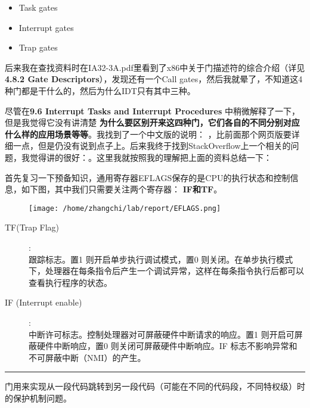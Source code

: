 \documentclass{article}
\newcommand{\highlight}[1]{{\bfseries \color{red}  #1}}
\begin{document}
\begin{CJK*}{UTF8}{gkai}
\begin{itemize}
\item{Task gates}
\item{Interrupt gates}
\item{Trap gates}
\end{itemize}

后来我在查找资料时在IA32-3A.pdf里看到了x86中关于门描述符的综合介绍（详见{\ttfamily \bfseries 4.8.2 Gate Descriptors}），发现还有一个Call gates，然后我就晕了，不知道这4种门都是干什么的，然后为什么IDT只有其中三种。

尽管在{\ttfamily \bfseries 9.6 Interrupt Tasks and Interrupt Procedures} 中稍微解释了一下，但是我觉得它没有讲清楚\highlight{为什么要区别开来这四种门，它们各自的不同分别对应什么样的应用场景等等}。我找到了一个中文版的说明： ，比前面那个网页版要详细一点，但是仍没有说到点子上。后来我终于找到StackOverflow上一个相关的问题，我觉得讲的很好：。这里我就按照我的理解把上面的资料总结一下：

首先复习一下预备知识，通用寄存器EFLAGS保存的是CPU的执行状态和控制信息，如下图，其中我们只需要关注两个寄存器：\highlight{IF和TF}。


\begin{figure}[htp]
\centering
\texttt{[image: /home/zhangchi/lab/report/EFLAGS.png]}
\end{figure}



\begin{description}
\item[TF(Trap Flag)] :\\
跟踪标志。置1 则开启单步执行调试模式，置0 则关闭。在单步执行模式下，处理器在每条指令后产生一个调试异常，这样在每条指令执行后都可以查看执行程序的状态。
\item[IF (Interrupt enable)] :\\
中断许可标志。控制处理器对可屏蔽硬件中断请求的响应。置1 则开启可屏蔽硬件中断响应，置0 则关闭可屏蔽硬件中断响应。IF 标志不影响异常和不可屏蔽中断（NMI）的产生。
\end{description}


\vspace{1em}

\hrule

\vspace{1em}

门用来实现从一段代码跳转到另一段代码（可能在不同的代码段，不同特权级）时的保护机制问题。


\end{CJK*}
\end{document}
